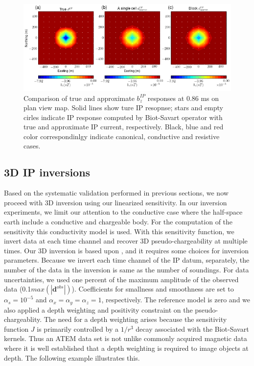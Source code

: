 \documentclass[a4paper, 11pt]{article}
\begin{document}
\begin{figure}[htb]
  \centering
  \includegraphics[width=1.\textwidth]{figures/EquivPeta_True_Approx.png}
  \caption{Comparison of true and approximate $b_z^{IP}$ responses at 0.86 ms on plan view map. 
  Solid lines show ture IP resopnse; stars and empty cirles indicate IP response computed by Biot-Savart operator with true and approximate IP current, respectively.  
  Black, blue and red color correspondinlgy indicate canonical, conductive and resistive cases. }
  \label{F:EquivPeta_True_Approx}
\end{figure}
\clearpage


\subsection{3D IP inversions}
Based on the systematic validation performed in previous sections, we now proceed with 3D  inversion using our linearized sensitivity.
In our inversion experiments, we limit our attention to the conductive case where the half-space earth include a conductive and chargeable body.
For the computation of the sensitivity this conductivity model is used. 
With this sensitivity function, we invert data at each  time channel and recover 3D pseudo-chargeability at multiple times. 
Our 3D inversion is based upon \cite{doug1994,Li2000}, and it requires some choices for inversion parameters. 
Because we invert each time channel of the IP datum, separately, the number of the data in the inversion is same as the number of soundings. 
For data uncertainties, we used one percent of the maximum amplitude of the observed data (0.1$max(|\mathbf{d}^{obs}|)$). Coefficients for smallness and smoothness are set to $\alpha_s=10^{-5}$ and $\alpha_x=\alpha_y=\alpha_z=1$, respectively. The reference model is zero and we also applied a depth weighting and positivity constraint on the pseudo-chargeablity. 
The need for a depth weighting arises because the sensitivity function $J$ is primarily controlled by a $1/r^3$ decay associated with the Biot-Savart kernels.  Thus an ATEM data set is not unlike commonly acquired  magnetic data where it is well established that a depth weighting is required to image objects at depth. The following example illustrates this. 
\end{document}
